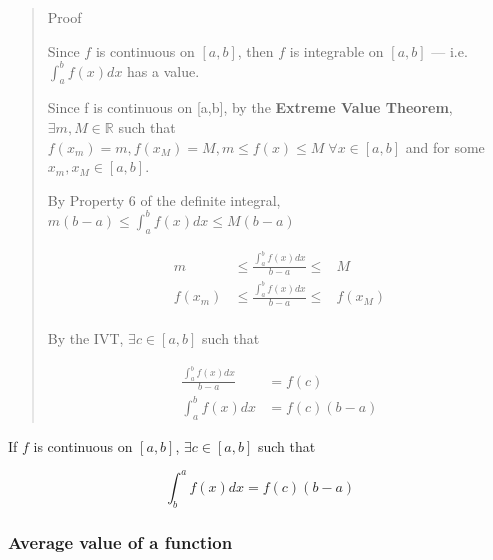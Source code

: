 \documentclass[
]{article}
\begin{document}
\begin{quote}
Proof

Since \(f\) is continuous on \([a,b]\), then \(f\) is integrable on
\([a,b]\) --- i.e.~\(\int_a^b f(x)dx\) has a value.

Since f is continuous on {[}a,b{]}, by the \textbf{Extreme Value
Theorem}, \(\exists m, M \in \mathbb{R}\) such that
\(f(x_m) = m, f(x_M) = M, m \leq f(x) \leq M \;\forall x \in [a,b]\) and
for some \(x_m, x_M \in [a,b]\).

By Property 6 of the definite integral,
\(\displaystyle m(b-a) \leq \int_a^b f(x)dx \leq M(b-a)\)

\begin{align*}
m      &\leq \frac{\int_a^b f(x)dx}{b-a} \leq& M \\
f(x_m) &\leq \frac{\int_a^b f(x)dx}{b-a} \leq& f(x_M)  \\
\end{align*}

By the IVT, \(\exists c \in [a,b]\) such that

\begin{align*}
\frac{\int_a^b f(x)dx}{b-a} &= f(c)\\
\int_a^b f(x)dx &= f(c)(b-a)
\end{align*}
\end{quote}

If \(f\) is continuous on \([a,b]\), \(\exists c \in [a,b]\) such that

\[ \int_b^a f(x)dx = f(c)(b-a) \]

\hypertarget{average-value-of-a-function}{%
\subsubsection{Average value of a
function}\label{average-value-of-a-function}}
\end{document}
